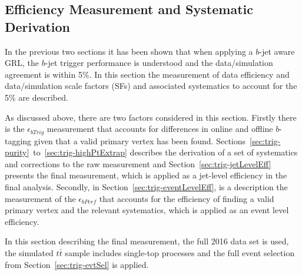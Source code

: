 \FloatBarrier
\newpage

\subsection{Efficiency Measurement and Systematic Derivation}
In the previous two sections it has been shown that when applying a $b$-jet aware GRL,
the $b$-jet trigger performance is understood and the data/simulation agreement is within 5\%.
In this section the measurement of data efficiency and data/simulation scale factors (SFs)
and associated systematics to account for the 5\% are described.

As discussed above, there are two factors considered in this section.
Firstly there is the $\epsilon_{bTrig}$ measurement
that accounts for differences in online and offline $b$-tagging given that a valid primary vertex has been found.
Sections~\ref{sec:trig-purity}~to~\ref{sec:trig-highPtExtrap} describes the derivation of a set of systematics and corrections to the raw measurement
and Section~\ref{sec:trig-jetLevelEff} presents the final measurement, which is applied as a jet-level efficiency in the final analysis.
Secondly, in Section~\ref{sec:trig-eventLevelEff}, is a description the measurement of the $\epsilon_{bPerf}$ that accounts
for the efficiency of finding a valid primary vertex and the relevant systematics, which is applied as an event level efficiency.

In this section describing the final measurement, the full 2016 data set is used,
the simulated ${t\bar{t}}$ sample includes single-top processes
and the full event selection from Section~\ref{sec:trig-evtSel} is applied.


